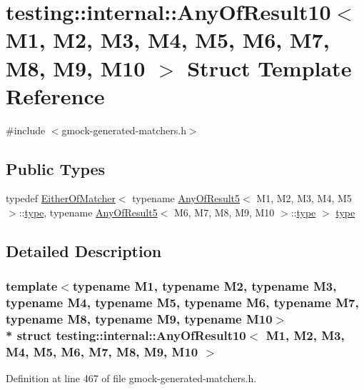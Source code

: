 \hypertarget{structtesting_1_1internal_1_1_any_of_result10}{}\section{testing\+:\+:internal\+:\+:Any\+Of\+Result10$<$ M1, M2, M3, M4, M5, M6, M7, M8, M9, M10 $>$ Struct Template Reference}
\label{structtesting_1_1internal_1_1_any_of_result10}


{\ttfamily \#include $<$gmock-\/generated-\/matchers.\+h$>$}

\subsection*{Public Types}
\begin{DoxyCompactItemize}
\item 
typedef \hyperlink{classtesting_1_1internal_1_1_either_of_matcher}{Either\+Of\+Matcher}$<$ typename \hyperlink{structtesting_1_1internal_1_1_any_of_result5}{Any\+Of\+Result5}$<$ M1, M2, M3, M4, M5 $>$\+::\hyperlink{structtesting_1_1internal_1_1_any_of_result10_aa1cb3d733f29716f2015db8a2b6c1c94}{type}, typename \hyperlink{structtesting_1_1internal_1_1_any_of_result5}{Any\+Of\+Result5}$<$ M6, M7, M8, M9, M10 $>$\+::\hyperlink{structtesting_1_1internal_1_1_any_of_result10_aa1cb3d733f29716f2015db8a2b6c1c94}{type} $>$ \hyperlink{structtesting_1_1internal_1_1_any_of_result10_aa1cb3d733f29716f2015db8a2b6c1c94}{type}
\end{DoxyCompactItemize}


\subsection{Detailed Description}
\subsubsection*{template$<$typename M1, typename M2, typename M3, typename M4, typename M5, typename M6, typename M7, typename M8, typename M9, typename M10$>$\\*
struct testing\+::internal\+::\+Any\+Of\+Result10$<$ M1, M2, M3, M4, M5, M6, M7, M8, M9, M10 $>$}



Definition at line 467 of file gmock-\/generated-\/matchers.\+h.




